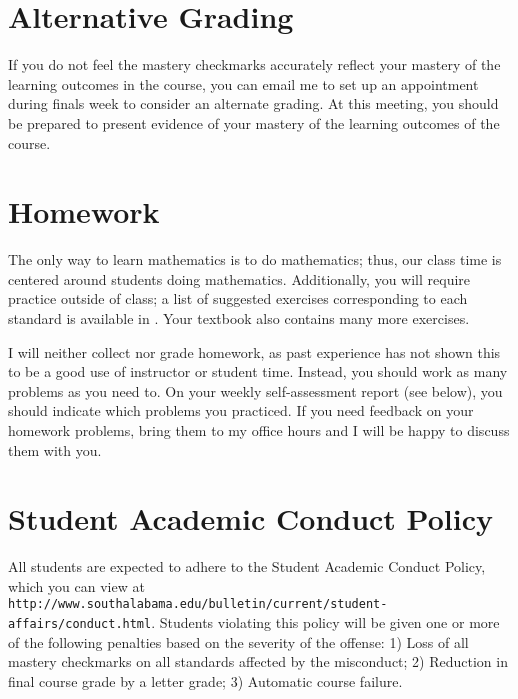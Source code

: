 \documentclass{article}
\begin{document}
\section*{\fontsize{12}{15}\selectfont Alternative Grading}
If you do not feel the mastery checkmarks accurately reflect your mastery of the learning outcomes in the course, you can email me to set up an appointment during finals week to consider an alternate grading. At this meeting, you should be prepared to present evidence of your mastery of the learning outcomes of the course.



\section*{\fontsize{12}{15}\selectfont Homework}
The only way to learn mathematics is to do mathematics; thus, our class time is centered around students doing mathematics.  Additionally, you will require practice outside of class; a list of suggested exercises corresponding to each standard is available in \LMS.  Your textbook also contains many more exercises.

I will neither collect nor grade homework, as past experience has not shown this to be a good use of instructor or student time.  Instead, you should work as many problems as you need to.  On your weekly self-assessment report (see below), you should indicate which problems you practiced. If you need feedback on your homework problems, bring them to my office hours and I will be happy to discuss them with you.



\section*{\fontsize{12}{15}\selectfont Student Academic Conduct Policy}
All students are expected to adhere to the Student Academic Conduct Policy, which you can view at
{\tt http://www.southalabama.edu/bulletin/current/student-affairs/conduct.html}.  Students violating this policy will be given one or more of the following penalties based on the severity of the offense:  1) Loss of all mastery checkmarks on all standards affected by the misconduct; 2) Reduction in final course grade by a letter grade; 3) Automatic course failure.
\end{document}
